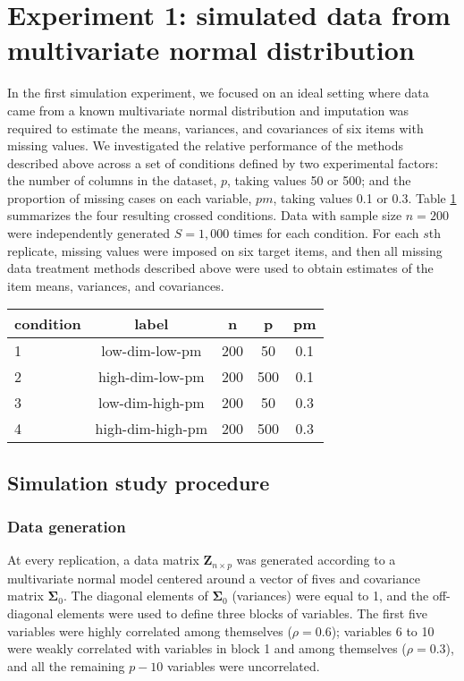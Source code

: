 \section{Experiment 1: simulated data from multivariate normal distribution}

	In the first simulation experiment, we focused on an ideal setting where data came from a known multivariate normal 
	distribution and imputation was required to estimate the means, variances, and covariances of six items with 
	missing values.
	We investigated the relative performance of the methods described above across a set of conditions defined by two 
	experimental factors: the number of columns in the dataset, $p$, taking values 50 or 500; 
	and the proportion of missing cases on each variable, $pm$, taking values 0.1 or 0.3.
	Table \ref{tab:condExp1} summarizes the four resulting crossed conditions.
	Data with sample size $n=200$ were independently generated $S = 1,000$ times for each condition.
	For each $s$th replicate, missing values were imposed on six target items, and then all missing data treatment methods described above
	were used to obtain estimates of the item means, variances, and covariances.

\begin{table}
	{
	\begin{tabular}{l c c c c } 
		\toprule
		condition & label & n & p & pm \\
		\midrule
		1 & low-dim-low-pm   & 200 & 50  & 0.1 \\
		2 & high-dim-low-pm  & 200 & 500 & 0.1 \\
		3 & low-dim-high-pm  & 200 & 50  & 0.3 \\
		4 & high-dim-high-pm & 200 & 500 & 0.3 \\
		\bottomrule
	\end{tabular}
	}
\label{tab:condExp1}
\end{table}


\subsection{Simulation study procedure}

\subsubsection{Data generation}
	At every replication, a data matrix $\bm{Z}_{n \times p}$ was generated according to a multivariate normal model centered around a vector of fives and covariance matrix $\bm{\Sigma}_0$. The diagonal elements of $\bm{\Sigma}_0$ (variances) were equal to 1, and the off-diagonal elements were used to define three blocks of variables. 
	The first five variables were highly correlated among themselves ($\rho = 0.6$);
	variables 6 to 10 were weakly correlated with variables in block 1 and among themselves ($\rho = 0.3$), 
	and all the remaining $p-10$ variables were uncorrelated.

